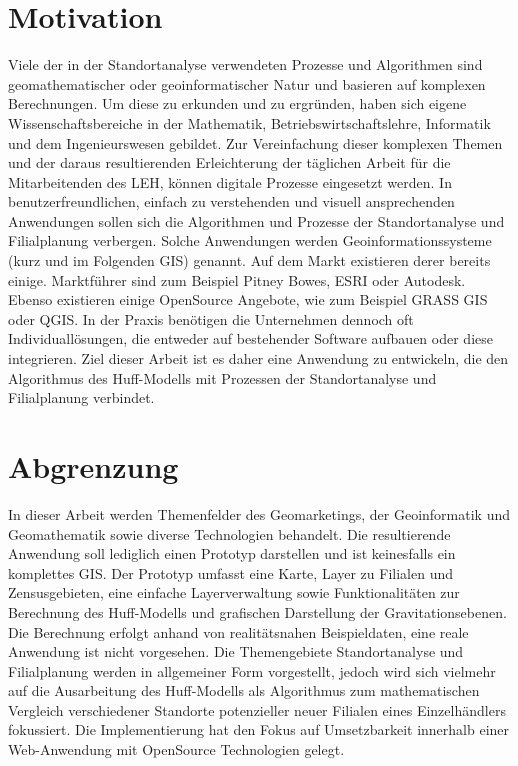 \section{Motivation}
Viele der in der Standortanalyse verwendeten Prozesse und Algorithmen sind geomathematischer oder geoinformatischer Natur und basieren auf komplexen Berechnungen.
Um diese zu erkunden und zu ergründen, haben sich eigene Wissenschaftsbereiche in der Mathematik, Betriebswirtschaftslehre, Informatik und dem Ingenieurswesen gebildet.
Zur Vereinfachung dieser komplexen Themen und der daraus resultierenden Erleichterung der täglichen Arbeit für die Mitarbeitenden des LEH, können digitale Prozesse eingesetzt werden.
In benutzerfreundlichen, einfach zu verstehenden und visuell ansprechenden Anwendungen sollen sich die Algorithmen und Prozesse der Standortanalyse und Filialplanung verbergen. 
Solche Anwendungen werden Geoinformationssysteme (kurz und im Folgenden GIS) genannt.
Auf dem Markt existieren derer bereits einige.
Marktführer sind zum Beispiel Pitney Bowes, ESRI oder Autodesk.
Ebenso existieren einige OpenSource Angebote, wie zum Beispiel GRASS GIS oder QGIS.
In der Praxis benötigen die Unternehmen dennoch oft Individuallösungen, die entweder auf bestehender Software aufbauen oder diese integrieren.
Ziel dieser Arbeit ist es daher eine Anwendung zu entwickeln, die den Algorithmus des Huff-Modells mit Prozessen der Standortanalyse und Filialplanung verbindet.


\section{Abgrenzung}
In dieser Arbeit werden Themenfelder des Geomarketings, der Geoinformatik und Geomathematik sowie diverse Technologien behandelt. 
Die resultierende Anwendung soll lediglich einen Prototyp darstellen und ist keinesfalls ein komplettes GIS. 
Der Prototyp umfasst eine Karte, Layer zu Filialen und Zensusgebieten, eine einfache Layerverwaltung sowie Funktionalitäten zur Berechnung des Huff-Modells und grafischen Darstellung der Gravitationsebenen.
Die Berechnung erfolgt anhand von realitätsnahen Beispieldaten, eine reale Anwendung ist nicht vorgesehen. 
Die Themengebiete Standortanalyse und Filialplanung werden in allgemeiner Form vorgestellt, jedoch wird sich vielmehr auf die Ausarbeitung des Huff-Modells als Algorithmus zum mathematischen Vergleich verschiedener Standorte potenzieller neuer Filialen eines Einzelhändlers fokussiert.
Die Implementierung hat den Fokus auf Umsetzbarkeit innerhalb einer Web-Anwendung mit OpenSource Technologien gelegt. 